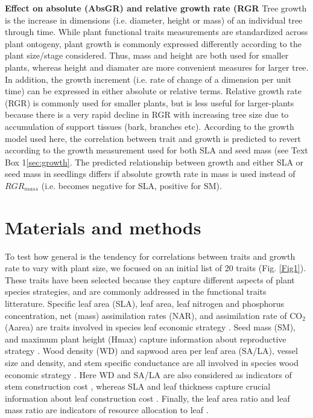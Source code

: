 \documentclass[a4paper]{article}\usepackage[]{graphicx}\usepackage[]{color}
\begin{document}
\textbf{Effect on absolute (AbsGR) and relative growth rate (RGR}
Tree growth is the increase in dimensions (i.e. diameter, height or mass) of an individual tree through time. While plant functional traits measurements are standardized across plant ontogeny, plant growth is commonly expressed differently according to the plant size/stage considered. Thus, mass and height are both used for smaller plants, whereas height and diamater are more convenient measures for larger tree. In addition, the growth increment (i.e. rate of change of a dimension per unit time) can be expressed in either absolute or relative terms. Relative growth rate (RGR) is commonly used for smaller plants, but is less useful for larger-plants because there is a very rapid decline in RGR with increasing tree size due to accumulation of support tissues (bark, branches etc). According to the growth model used here, the correlation between trait and growth is predicted to revert according to the growth measurement used for both SLA and seed mass (see Text Box 1\ref{sec:growth}. The predicted relationship between growth and either SLA or seed mass in seedlings differs if absolute growth rate in mass is used instead of $RGR_{mass}$ (i.e. becomes negative for SLA, positive for SM). 


\section*{Materials and methods}\label{material-and-methods}

To test how general is the tendency for correlations between traits and growth rate to vary with plant size, we focused on an initial list of 20 traits (Fig. \ref{Fig1}). These traits have been selected because they capture different aspects of plant species strategies, and are commonly addressed in the functional traits litterature. Specific leaf area (SLA), leaf area, leaf nitrogen and phosphorus concentration, net (mass) assimilation rates (NAR), and assimilation rate of CO$_2$ (Aarea) are traits involved in species leaf economic strategy \citep{Wright:2004jb,Wright:2010tp}. Seed mass (SM), and maximum plant height (Hmax) capture information about reproductive strategy \citep{Falster:2005bw,Moles:2006ft}. Wood density (WD) and sapwood area per leaf area (SA/LA), vessel size and density, and stem specific conductance are all involved in species wood economic strategy \citep{Chave:2009iy}. Here WD and SA/LA are also considered as indicators of stem construction cost \citep{Falster:2011ii}, whereas SLA and leaf thickness capture crucial information about leaf construction cost \citep{Wright:2004jb}. Finally, the leaf area ratio and leaf mass ratio are indicators of resource allocation to leaf \citep{Lambers:1992bj}.
\end{document}
